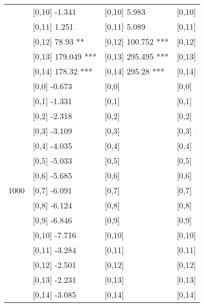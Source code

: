\begin{table}
\begin{tabular}[t]{llll}
\addlinespace
 & {}[0,10] -1.341 & {}[0,10] 5.983 & {}[0,10]\\
 & {}[0,11] 1.251 & {}[0,11] 5.089 & {}[0,11]\\
 & {}[0,12] 78.93 ** & {}[0,12] 100.752 *** & {}[0,12]\\
 & {}[0,13] 179.049 *** & {}[0,13] 295.495 *** & {}[0,13]\\
 & {}[0,14] 178.32 *** & {}[0,14] 295.28 *** & {}[0,14]\\
\addlinespace
 & {}[0,0] -0.673 & {}[0,0] & {}[0,0]\\
 & {}[0,1] -1.331 & {}[0,1] & {}[0,1]\\
 & {}[0,2] -2.318 & {}[0,2] & {}[0,2]\\
 & {}[0,3] -3.109 & {}[0,3] & {}[0,3]\\
 & {}[0,4] -4.035 & {}[0,4] & {}[0,4]\\
\addlinespace
 & {}[0,5] -5.033 & {}[0,5] & {}[0,5]\\
 & {}[0,6] -5.685 & {}[0,6] & {}[0,6]\\
1000 & {}[0,7] -6.091 & {}[0,7] & {}[0,7]\\
 & {}[0,8] -6.124 & {}[0,8] & {}[0,8]\\
 & {}[0,9] -6.846 & {}[0,9] & {}[0,9]\\
\addlinespace
 & {}[0,10] -7.716 & {}[0,10] & {}[0,10]\\
 & {}[0,11] -3.284 & {}[0,11] & {}[0,11]\\
 & {}[0,12] -2.501 & {}[0,12] & {}[0,12]\\
 & {}[0,13] -2.231 & {}[0,13] & {}[0,13]\\
 & {}[0,14] -3.085 & {}[0,14] & {}[0,14]\\
\bottomrule
\end{tabular}
\end{table}
